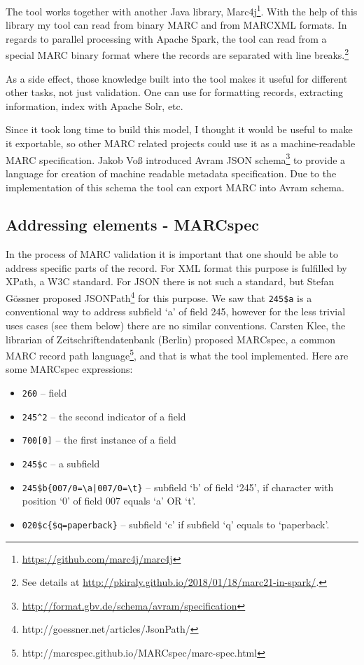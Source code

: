 The tool works together with another Java library, Marc4j\footnote{\url{https://github.com/marc4j/marc4j}}. With the help of this library my tool can read from binary MARC and from MARCXML formats. In regards to parallel processing with Apache Spark, the tool can read from a special MARC binary format where the records are separated with line breaks.\footnote{See details at \url{http://pkiraly.github.io/2018/01/18/marc21-in-spark/}.}

As a side effect, those knowledge built into the tool makes it useful for different other tasks, not just validation. One can use for formatting records, extracting information, index with Apache Solr, etc.

Since it took long time to build this model, I thought it would be useful to make it exportable, so other MARC related projects could use it as a machine-readable MARC specification. Jakob Voß introduced Avram JSON schema\footnote{\url{http://format.gbv.de/schema/avram/specification}} to provide a language for creation of machine readable metadata specification. Due to the implementation of this schema the tool can export MARC into Avram schema.  

\subsection{Addressing elements - MARCspec}

In the process of MARC validation it is important that one should be able to address specific parts of the record. For XML format this purpose is fulfilled by XPath, a W3C standard. For JSON there is not such a standard, but Stefan Gössner proposed JSONPath\footnote{http://goessner.net/articles/JsonPath/} for this purpose. We saw that \verb|245$a| is a conventional way to address subfield `a' of field 245, however for the less trivial uses cases (see them below) there are no similar conventions. Carsten Klee, the librarian of Zeitschriftendatenbank (Berlin) proposed MARCspec, a common MARC record path language\footnote{http://marcspec.github.io/MARCspec/marc-spec.html}, and that is what the tool implemented. Here are some MARCspec expressions:

\begin{itemize}
 \setlength{\parskip}{0pt}
 \setlength{\itemsep}{0pt plus 1pt}
  \item \verb|260| -- field
  \item \verb|245^2| -- the second indicator of a field
  \item \verb|700[0]| -- the first instance of a field
  \item \verb|245$c| -- a subfield
  \item \verb:245$b{007/0=\a|007/0=\t}: -- subfield ‘b’ of field ‘245’, if character with position ‘0’ of field 007 equals ‘a’ OR ‘t’.
  \item \verb|020$c{$q=paperback}| -- subfield ‘c’ if subfield ‘q’ equals to ‘paperback’.
\end{itemize}

